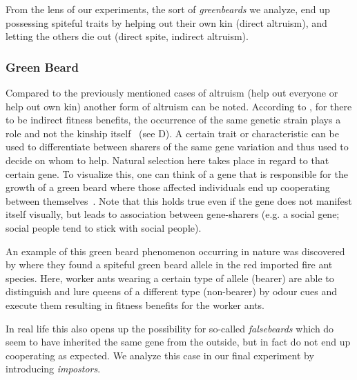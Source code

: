 \documentclass[sigconf]{acmart}
\newcommand{\impostors}{\textit{impostors}\xspace}
\newcommand{\greenbeards}{\textit{greenbeards}\xspace}
\begin{document}
    From the lens of our experiments, the sort of \greenbeards we analyze, end up possessing spiteful traits by helping out their own kin (direct altruism), and letting the others die out (direct spite, indirect altruism).

    \subsubsection{Green Beard}
    Compared to the previously mentioned cases of altruism (help out everyone or help out own kin) another form of altruism can be noted.
    According to \citeauthor{hamiltonInnateSocialAptitudes1975}, for there to be indirect fitness benefits, the occurrence of the same genetic strain plays a role and not the kinship itself~\cite{hamiltonInnateSocialAptitudes1975} (see  D).
    A certain trait or characteristic can be used to differentiate between sharers of the same gene variation and thus used to decide on whom to help.
    Natural selection here takes place in regard to that certain gene.
    To visualize this, one can think of a gene that is responsible for the growth of a green beard where those affected individuals end up cooperating between themselves~\cite{SelfishGeneRichard}.
    Note that this holds true even if the gene does not manifest itself visually, but leads to association between gene-sharers (e.g. a social gene; social people tend to stick with social people).

    An example of this green beard phenomenon occurring in nature was discovered by \citeauthor{keller_selfish_1998} \cite{keller_selfish_1998} where they found a spiteful green beard allele in the red imported fire ant species.
    Here, worker ants wearing a certain type of allele (bearer) are able to distinguish and lure queens of a different type (non-bearer) by odour cues and execute them resulting in fitness benefits for the worker ants.

    In real life this also opens up the possibility for so-called \textit{falsebeards} which do seem to have inherited the same gene from the outside, but in fact do not end up cooperating as expected.
    We analyze this case in our final experiment by introducing \impostors.
\end{document}
